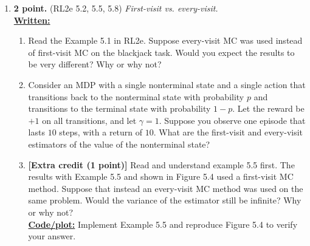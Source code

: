 \documentclass{article}
\newcommand{\solnewpage}{\newpage}
\newcommand{\solnewpage}{}
\begin{document}
\begin{enumerate}

	\item \textbf{2 point.} (RL2e 5.2, 5.5, 5.8) \textit{First-visit vs. every-visit.} \\
	      \uline{\textbf{Written:}}
	      \begin{enumerate}
		      \item Read the Example 5.1 in RL2e. Suppose every-visit MC was used instead of first-visit MC on the blackjack task. Would you expect the results to be very different? Why or why not?

		      \item Consider an MDP with a single nonterminal state and a single action that transitions back to the nonterminal state with probability $p$ and transitions to the terminal state with probability $1-p$. Let the reward be $+1$ on all transitions, and let $\gamma = 1$. Suppose you observe one episode that lasts $10$ steps, with a return of $10$. What are the first-visit and every-visit estimators of the value of the nonterminal state?

                \item \textbf{[Extra credit (1 point)]} Read and understand example 5.5 first.
The results with Example 5.5 and shown in Figure 5.4 used a first-visit MC method. Suppose that instead an every-visit MC method was used on the same problem. Would the variance of the estimator still be infinite? Why or why not? \\
            \uline{\textbf{Code/plot:}} Implement Example 5.5 and reproduce Figure 5.4 to verify your answer.

\end{enumerate}

\solnewpage


\end{enumerate}
\end{document}
